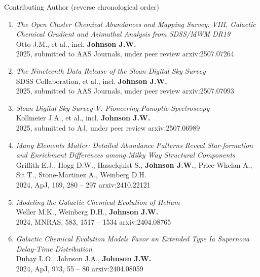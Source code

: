 \documentclass[cv.tex]{subfiles}
\begin{document}
\par\noindent
{\color{themecolor} \large Contributing Author}
(reverse chronological order)
\par\noindent
\begin{enumerate}

	\vspace{-3mm}

	\item \textit{The Open Cluster Chemical Abundances and Mapping Survey: VIII.
	Galactic Chemical Gradient and Azimuthal Analysis from SDSS/MWM DR19}
	\\
	Otto J.M., et al., incl. \textbf{Johnson J.W.}
	\\
	2025, submitted to AAS Journals, under peer review \hfill arxiv:2507.07264

	\item \textit{The Nineteenth Data Release of the Sloan Digital Sky Survey}
	\\
	SDSS Collaboration, et al., incl. \textbf{Johnson J.W.}
	\\
	2025, submitted to AAS Journals, under peer review \hfill arxiv:2507.07093

	\item \textit{Sloan Digital Sky Survey-V: Pioneering Panoptic Spectroscopy}
	\\
	Kollmeier J.A., et al., incl. \textbf{Johnson J.W.}
	\\
	2025, submitted to AJ, under peer review \hfill arxiv:2507.06989

	\item \textit{Many Elements Matter: Detailed Abundance Patterns Reveal
	Star-formation and Enrichment Differences among Milky Way Structural
	Components}
	\\
	Griffith E.J., Hogg D.W., Hasselquist S., \textbf{Johnson J.W.},
	Price-Whelan A., Sit T., Stone-Martinez A., Weinberg D.H.
	\\
	2024, ApJ, 169, 280 -- 297 \hfill arxiv:2410.22121

	\item \textit{Modeling the Galactic Chemical Evolution of Helium}
	\\
	Weller M.K., Weinberg D.H., \textbf{Johnson J.W.}
	\\
	2024, MNRAS, 583, 1517 -- 1534 \hfill arxiv:2404.08765

	\item \textit{Galactic Chemical Evolution Models Favor an Extended Type Ia
	Supernova Delay-Time Distribution}
	\\
	Dubay L.O., Johnson J.A., \textbf{Johnson J.W.}
	\\
	2024, ApJ, 973, 55 -- 80 \hfill arxiv:2404.08059


\end{enumerate}
\end{document}
